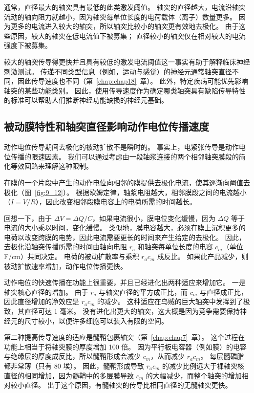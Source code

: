 通常，直径最大的轴突具有最低的此类激发阈值。
轴突的直径越大，电流沿轴突流动的轴向阻力就越小，因为轴突每单位长度的电荷载体（离子）数量更多。
因为更多的电流进入较大的轴突，所以轴突比较小的轴突更有效地去极化。
由于这些原因，较大的轴突在低电流值下被募集；
直径较小的轴突仅在相对较大的电流强度下被募集。


较大的轴突传导得更快并且具有较低的激发电流阈值这一事实有助于解释临床神经刺激测试。
传递不同类型信息（例如，运动与感觉）的神经元通常轴突直径不同，因此传导速度也不同（第~\ref{chap:chap18}~章）。
此外，特定疾病可能优先影响轴突的某些功能类别。
因此，使用传导速度作为确定哪类轴突具有缺陷传导特性的标准可以帮助人们推断神经功能缺损的神经元基础。



\subsection{被动膜特性和轴突直径影响动作电位传播速度}

动作电位传导期间去极化的被动扩散不是瞬时的。
事实上，电紧张传导是动作电位传播的限速因素。
我们可以通过考虑由一段轴浆连接的两个相邻轴突膜段的简化等效回路来理解这种限制。


在膜的一个片段中产生的动作电位向相邻的膜提供去极化电流，使其逐渐向阈值去极化（图~\ref{fig:9_12}）。 
根据欧姆定律，轴浆电阻越大，相邻膜段之间的电流越小（$I = V / R$），因此改变相邻段膜电容上的电荷所需的时间越长。


回想一下，由于 $\Delta V = \Delta Q / C$，如果电流很小，膜电位变化缓慢，因为 $\Delta Q$ 等于电流的大小乘以时间，变化缓慢。
类似地，膜电容越大，必须在膜上沉积更多的电荷以改变跨膜的电势，因此电流需要更长的时间来产生给定的去极化。
因此，去极化沿轴突传播所需的时间由轴向电阻 $r_a$ 和轴突每单位长度的电容 $c_m$（单位 F/cm）共同决定。
电荷的被动扩散率与乘积 $r_a c_m$ 成反比。
如果此产品减少，则被动扩散速率增加，动作电位传播更快。


动作电位的快速传播在功能上很重要，并且已经进化出两种适应来增加它。
一是轴突核心直径的增加。
由于 $r_a$ 与轴突直径的平方成正比，而 $c_m$ 与直径成正比，因此直径增加的净效应是 $r_a c_m$ 的减少。
这种适应在乌贼的巨大轴突中发挥到了极致，其直径可达 1 毫米。
没有进化出更大的轴突，这大概是因为竞争需要保持神经元的尺寸较小，以便许多细胞可以装入有限的空间。


第二种提高传导速度的适应是髓鞘包裹轴突（第~\ref{chap:chap7}~章）。
这个过程在功能上相当于将轴突膜的厚度增加 100 倍。
因为平行板电容器（例如膜）的电容与绝缘层的厚度成反比，所以髓鞘形成会减少 $c_m$，从而减少 $r_a c_m$。
每层髓磷脂都非常薄（只有 80 埃）。
因此，髓鞘形成导致 $r_a c_m$ 的减少比例远大于裸轴突核直径的相同增加，因为髓鞘中的多层膜导致 $c_m$ 的大幅减少，而整个轴突的增加相对较小直径。
出于这个原因，有髓轴突的传导比相同直径的无髓轴突更快。


